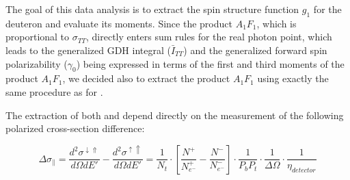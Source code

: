 The goal of this data analysis is to extract the spin structure function $g_1$ for the deuteron and evaluate its moments. Since the product $A_1F_1$, which is proportional to $\sigma_{TT}$, directly enters sum rules for the real photon point, which leads to the generalized GDH integral ($\bar{I}_{TT}$) and the generalized forward spin polarizability ($\gamma_0$) being expressed in terms of the first and third moments of the product $A_1F_1$, we decided also to extract the product $A_1F_1$ using exactly the same procedure as for \gone. 

The extraction of both \gones and \afones depend directly on the measurement of the following polarized cross-section difference:

\begin{equation}
  \Delta \sigma_{\parallel} = \frac{d^2\sigma^{\downarrow \Uparrow } }{d\Omega dE'} - \frac{d^2\sigma^{\uparrow \Uparrow } }{d\Omega dE'}
    = \frac{1}{N_t}\cdot \left[ \frac{N^+}{N^+_{e^-}} - \frac{N^-}{N^-_{e^-}} \right]\cdot \frac{1}{P_bP_t} \cdot \frac{1}{\Delta\Omega}\cdot \frac{1}{\eta_{detector}}
  \label{eqXSdiff}
\end{equation}


